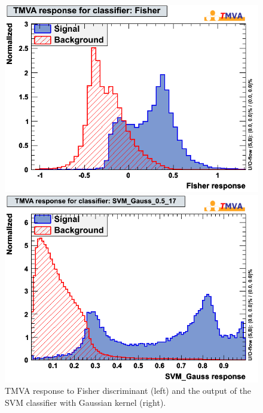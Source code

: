 \documentclass[a4paper]{jpconf}
\begin{document}
\begin{figure}[h]
 \begin{minipage}{8.0cm}
\includegraphics[width=1.0\textwidth]{images/mva_Fisher.png}
\end{minipage}
 \hfill
\begin{minipage}{8.0cm}
\includegraphics[width=1.0\textwidth]{images/mk_svm_gauss2.png}



\end{minipage}
\caption{\label{fig:fishersvm}TMVA response to Fisher discriminant (left) and 
the output of the SVM classifier with Gaussian kernel (right).}
\end{figure}
\end{document}
